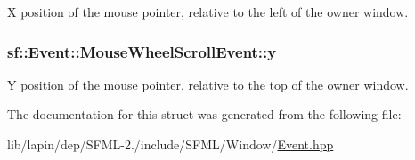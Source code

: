 X position of the mouse pointer, relative to the left of the owner window. 

\hypertarget{structsf_1_1_event_1_1_mouse_wheel_scroll_event_aa38bf23704162024eed19917eef3853c}{
\subsubsection[{y}]{ sf\-::\-Event\-::\-Mouse\-Wheel\-Scroll\-Event\-::y}}\label{structsf_1_1_event_1_1_mouse_wheel_scroll_event_aa38bf23704162024eed19917eef3853c}


Y position of the mouse pointer, relative to the top of the owner window. 



The documentation for this struct was generated from the following file\-:\begin{DoxyCompactItemize}
\item 
lib/lapin/dep/\-S\-F\-M\-L-\/2./include/\-S\-F\-M\-L/\-Window/\hyperlink{lib_2lapin_2dep_2_s_f_m_l-2_83_2include_2_s_f_m_l_2_window_2_event_8hpp}{Event.\-hpp}\end{DoxyCompactItemize}
